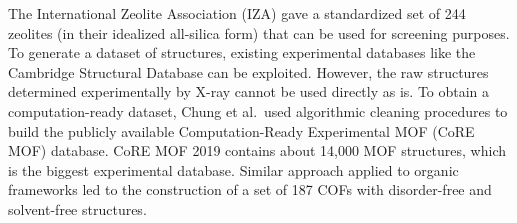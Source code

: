 \documentclass[main.tex]{subfiles}
\begin{document}
The International Zeolite Association (IZA) gave a standardized set of 244 zeolites (in their idealized all-silica form) that can be used for screening purposes. To generate a dataset of structures, existing experimental databases like the Cambridge Structural Database can be exploited. However, the raw structures determined experimentally by X-ray cannot be used directly as is. To obtain a computation-ready dataset, Chung et al.\ used algorithmic cleaning procedures to build the publicly available Computation-Ready Experimental MOF (CoRE MOF) database.\autocite{Chung_2014, Chung_2019} CoRE MOF 2019 contains about 14,000 MOF structures, which is the biggest experimental database. Similar approach applied to organic frameworks led to the construction of a set of 187 COFs with disorder-free and solvent-free structures.\autocite{Tong_2017,Ongari_2019}
\end{document}
